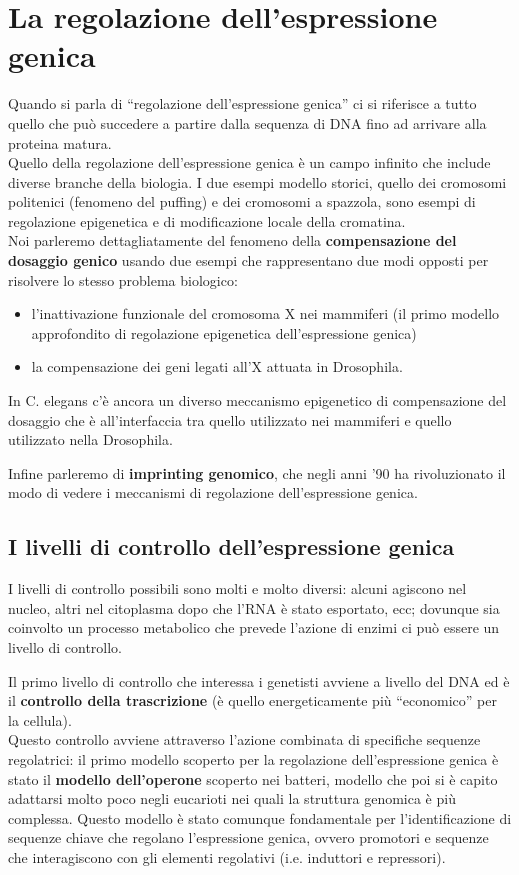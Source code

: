 \documentclass[11pt]{book}
\begin{document}
\chapter{La regolazione dell'espressione genica}
Quando si parla di ``regolazione dell’espressione genica'' ci si riferisce a tutto quello che può succedere a partire dalla sequenza di DNA fino ad arrivare alla proteina matura.\\
Quello della regolazione dell’espressione genica è un campo infinito che include diverse branche della biologia. I due esempi modello storici, quello dei cromosomi politenici (fenomeno del puffing) e dei cromosomi a spazzola, sono esempi di regolazione epigenetica e di modificazione locale della cromatina.\\
Noi parleremo dettagliatamente del fenomeno della \textbf{compensazione del dosaggio genico} usando due esempi che rappresentano due modi opposti per risolvere lo stesso problema biologico:
\begin{itemize}
\item l’inattivazione funzionale del cromosoma X nei mammiferi (il primo modello approfondito di regolazione epigenetica dell’espressione genica)
\item la compensazione dei geni legati all’X attuata in Drosophila.
\end{itemize}

In C. elegans c’è ancora un diverso meccanismo epigenetico di compensazione del dosaggio che è all’interfaccia tra quello utilizzato nei mammiferi e quello utilizzato nella Drosophila.

Infine parleremo di \textbf{imprinting genomico}, che negli anni '90 ha rivoluzionato il modo di vedere i meccanismi di regolazione dell’espressione genica.


\section{I livelli di controllo dell'espressione genica}
I livelli di controllo possibili sono molti e molto diversi: alcuni agiscono nel nucleo, altri nel citoplasma dopo che l’RNA è stato esportato, ecc; dovunque sia coinvolto un processo metabolico che prevede l’azione di enzimi ci può essere un livello di controllo.

Il primo livello di controllo che interessa i genetisti avviene a livello del DNA ed è il \textbf{controllo della trascrizione} (è quello energeticamente più ``economico'' per la cellula).\\
Questo controllo avviene attraverso l’azione combinata di specifiche sequenze regolatrici: il primo modello scoperto per la regolazione dell’espressione genica è stato il \textbf{modello dell’operone} scoperto nei batteri, modello che poi si è capito adattarsi molto poco negli eucarioti nei quali la struttura genomica è più complessa. Questo modello è stato comunque fondamentale per l’identificazione di sequenze chiave che regolano l’espressione genica, ovvero promotori e sequenze che interagiscono con gli elementi regolativi (i.e. induttori e repressori).
\end{document}
